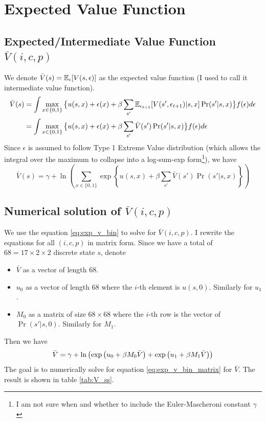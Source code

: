 \documentclass[12pt]{article}[margin=1in]
\begin{document}
\section{Expected Value Function}
\subsection{Expected/Intermediate Value Function $\bar{V}(i,c,p)$}
We denote $\bar{V}(s) = \mathbb{E}_{\epsilon}[V(s,\epsilon)]$ as the expected value function (I used to call it intermediate value function).
\begin{equation}\label{eq:exp_v}
    \begin{split}
        \bar{V}(s) & =\int \max_{x \in \{0,1\}} \big\{ u(s,x) + \epsilon(x)+ \beta \sum_{s'}\mathbb{E}_{\epsilon_{t+1}}[V(s',\epsilon_{t+1})|s,x] \Pr(s'|s,x)\big\}  f(\epsilon) d\epsilon \\
                   & =\int \max_{x \in \{0,1\}} \big\{ u(s,x) + \epsilon(x)+ \beta \sum_{s'}\bar{V}(s') \Pr(s'|s,x)\big\}  f(\epsilon) d\epsilon
    \end{split}
\end{equation}
Since $\epsilon$ is assumed to follow Type 1 Extreme Value distribution (which allows the integral over the maximum to collapse into a log-sum-exp form\footnote{I am not sure when and whether to include the Euler-Mascheroni constant $\gamma$}), we have
\begin{equation} \label{eq:exp_v_bin}
    \bar{V}(s) = \gamma+\ln\left(\sum_{x \in \{0,1\}} \exp\left\{ u(s,x) + \beta \sum_{s'}\bar{V}(s') \Pr(s'|s,x)\right\}\right)
\end{equation}

\subsection{Numerical solution of $\bar{V}(i,c,p)$}
We use the equation \ref{eq:exp_v_bin} to solve for $\bar{V}(i,c,p)$.  I rewrite the equations for all $(i,c,p)$ in matrix form. Since we have a total of $68=17\times 2\times 2$ discrete state $s$, denote
\begin{itemize}
    \item $\bar{V}$ as a vector of length 68.
    \item $u_0$ as a vector of length 68 where the $i$-th element is $u(s,0)$. Similarly for $u_1$.
    \item $M_0$ as a matrix of size $68 \times 68$ where the $i$-th row is the vector of $\Pr(s'|s,0)$. Similarly for $M_1$.
\end{itemize}
Then we have
\begin{equation}\label{eq:exp_v_bin_matrix}
    \bar{V}= \gamma + \ln\left(\exp\left(u_0 + \beta M_0 \bar{V}\right) + \exp\left(u_1 + \beta M_1 \bar{V}\right)\right)
\end{equation}
The goal is to numerically solve for equation \ref{eq:exp_v_bin_matrix} for $\bar{V}$. The result is shown in table \ref{tab:V_ss}.
\newpage
\begin{table} \fontsize{6pt}{8pt}\selectfont
    \centering
    
    \caption{Expected value function $\bar{V}(i,c,p)$ for each state $s=(i,c,p)$}
    \label{tab:V_ss}
\end{table}
\newpage
\end{document}
